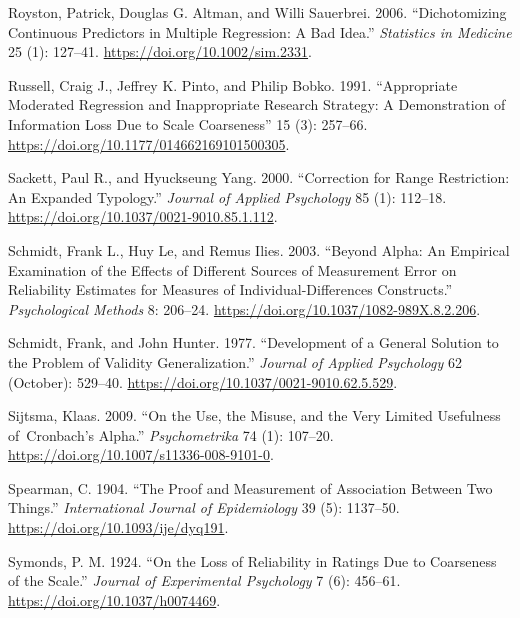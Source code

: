 \documentclass[
  letterpaper,
  DIV=11,
  numbers=noendperiod]{scrreprt}
\newlength{\cslhangindent}
\newlength{\cslentryspacingunit} %
\newenvironment{CSLReferences}[2] %
 {%
  \setlength{\parindent}{0pt}
  \ifodd #1
  \let\oldpar\par
  \def\par{\hangindent=\cslhangindent\oldpar}
  \fi
  \setlength{\parskip}{#2\cslentryspacingunit}
 }%
 {}
\begin{document}
\begin{CSLReferences}{1}{0}
\leavevmode{}%
Royston, Patrick, Douglas G. Altman, and Willi Sauerbrei. 2006.
{``Dichotomizing Continuous Predictors in Multiple Regression: A Bad
Idea.''} \emph{Statistics in Medicine} 25 (1): 127--41.
\url{https://doi.org/10.1002/sim.2331}.

\leavevmode{}%
Russell, Craig J., Jeffrey K. Pinto, and Philip Bobko. 1991.
{``Appropriate Moderated Regression and Inappropriate Research Strategy:
A Demonstration of Information Loss Due to Scale Coarseness''} 15 (3):
257--66. \url{https://doi.org/10.1177/014662169101500305}.

\leavevmode{}%
Sackett, Paul R., and Hyuckseung Yang. 2000. {``Correction for Range
Restriction: An Expanded Typology.''} \emph{Journal of Applied
Psychology} 85 (1): 112--18.
\url{https://doi.org/10.1037/0021-9010.85.1.112}.

\leavevmode{}%
Schmidt, Frank L., Huy Le, and Remus Ilies. 2003. {``Beyond Alpha: An
Empirical Examination of the Effects of Different Sources of Measurement
Error on Reliability Estimates for Measures of Individual-Differences
Constructs.''} \emph{Psychological Methods} 8: 206--24.
\url{https://doi.org/10.1037/1082-989X.8.2.206}.

\leavevmode{}%
Schmidt, Frank, and John Hunter. 1977. {``Development of a General
Solution to the Problem of Validity Generalization.''} \emph{Journal of
Applied Psychology} 62 (October): 529--40.
\url{https://doi.org/10.1037/0021-9010.62.5.529}.

\leavevmode{}%
Sijtsma, Klaas. 2009. {``On the Use, the Misuse, and the Very Limited
Usefulness of~Cronbach{'}s Alpha.''} \emph{Psychometrika} 74 (1):
107--20. \url{https://doi.org/10.1007/s11336-008-9101-0}.

\leavevmode{}%
Spearman, C. 1904. {``The Proof and Measurement of Association Between
Two Things.''} \emph{International Journal of Epidemiology} 39 (5):
1137--50. \url{https://doi.org/10.1093/ije/dyq191}.

\leavevmode{}%
Symonds, P. M. 1924. {``On the Loss of Reliability in Ratings Due to
Coarseness of the Scale.''} \emph{Journal of Experimental Psychology} 7
(6): 456--61. \url{https://doi.org/10.1037/h0074469}.


\end{CSLReferences}
\end{document}
